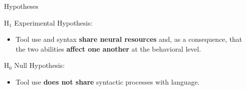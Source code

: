 \begin{frame}{Hypotheses}
\fontsize{11pt}{16}\selectfont
\begin{block}
{H$_1$ Experimental Hypothesis:} \begin{itemize}
    \item Tool use and syntax \textbf{share neural resources} and, as a consequence, that the two abilities \textbf{affect one another} at the behavioral level.
\end{itemize}
 \end{block}

\pause
\bigskip

\begin{block}
{H$_0$ Null Hypothesis:} \begin{itemize}
    \item Tool use \textbf{does not share} syntactic processes with language.
\end{itemize}
 \end{block}

\end{frame}